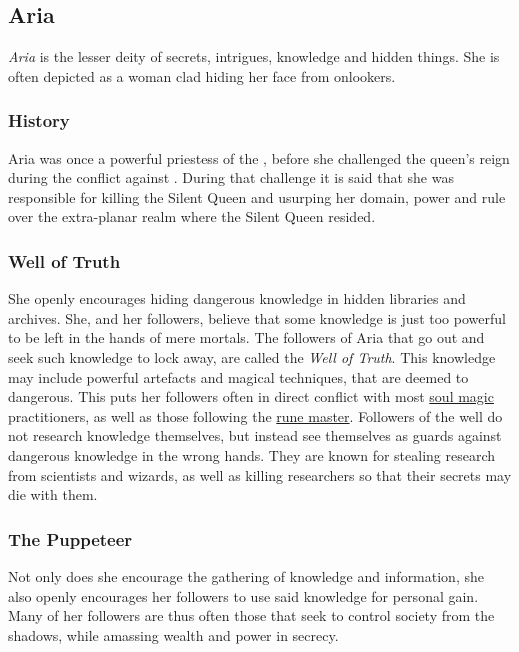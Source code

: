 \subsection{Aria}
\label{sec:Aria}


\emph{Aria} is the lesser deity of secrets, intrigues, knowledge and hidden
things. She is often depicted as a woman clad hiding her face from onlookers.

\subsubsection{History}

Aria was once a powerful priestess of the , before
she challenged the queen's reign during the conflict against
.  During that challenge it is said that she was
responsible for killing the Silent Queen and usurping her domain, power and
rule over the extra-planar realm where the Silent Queen resided.

\subsubsection{Well of Truth}
\label{sec:Well of Truth}

She openly encourages hiding dangerous knowledge in hidden libraries and
archives. She, and her followers, believe that some knowledge is just too
powerful to be left in the hands of mere mortals. The followers of Aria
that go out and seek such knowledge to lock away, are called the \emph{Well of
  Truth}. This knowledge may include powerful artefacts and magical
techniques, that are deemed to dangerous. This puts her followers often in
direct conflict with most \hyperref[sec:Soul Magic]{soul magic} practitioners,
as well as those following the \hyperref[sec:Rune Master]{rune
  master}. Followers of the well do not research knowledge themselves, but
instead see themselves as guards against dangerous knowledge in the wrong
hands. They are known for stealing research from scientists and wizards, as
well as killing researchers so that their secrets may die with them.

\subsubsection{The Puppeteer}

Not only does she encourage the gathering of knowledge and information, she
also openly encourages her followers to use said knowledge for personal gain.
Many of her followers are thus often those that seek to control society from
the shadows, while amassing wealth and power in secrecy.

